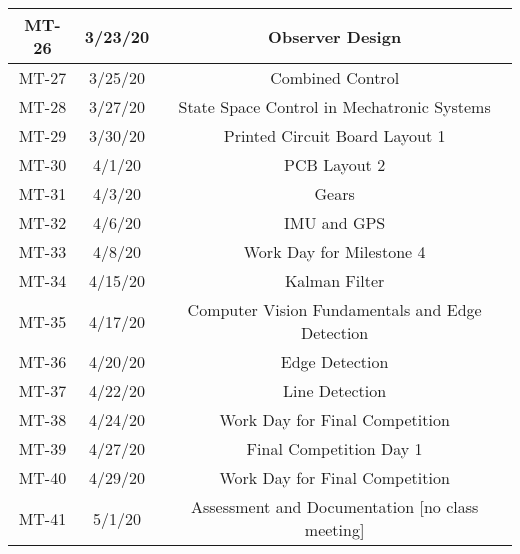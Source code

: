 \documentclass[12pt,letterpaper,onecolumn]{report}
\begin{document}
\begin{center}
\begin{tabular}{|c|c|c|}
\hline 
MT-26 & 3/23/20 & Observer Design\\ 
\hline 
MT-27 & 3/25/20 & Combined Control\\ 
\hline
MT-28 & 3/27/20 & State Space Control in Mechatronic Systems\\
\hline
MT-29 & 3/30/20 & Printed Circuit Board Layout 1\\
\hline
MT-30 & 4/1/20 & PCB Layout 2\\
\hline
MT-31 & 4/3/20 & Gears\\
\hline
MT-32 & 4/6/20 & IMU and GPS\\
\hline
MT-33 & 4/8/20 & Work Day for Milestone 4\\
\hline
MT-34 & 4/15/20 & Kalman Filter\\
\hline
MT-35 & 4/17/20 & Computer Vision Fundamentals and Edge Detection\\
\hline
MT-36 & 4/20/20 & Edge Detection\\
\hline
MT-37 & 4/22/20 & Line Detection\\
\hline
MT-38 & 4/24/20 & Work Day for Final Competition\\
\hline
MT-39 & 4/27/20 & Final Competition Day 1\\
\hline
MT-40 & 4/29/20 & Work Day for Final Competition\\
\hline
MT-41 & 5/1/20 & Assessment and Documentation [no class meeting]\\
\hline


\end{tabular} 
\end{center}
\end{document}
